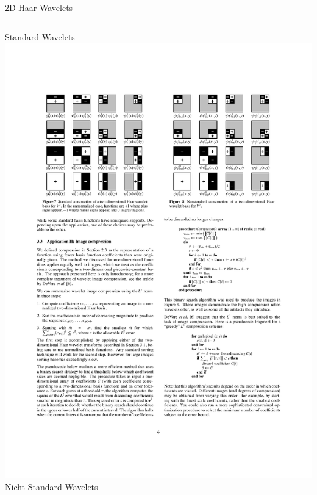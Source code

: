 	{
	\begin{frame}{2D Haar-Wavelets}
		\begin{columns}[T, onlytextwidth]
			\centering
			\alert{Standard-Wavelets}\vspace{4mm}\\
			\includegraphics[trim=79 545 325 100, clip, width=\textwidth]{2d_wavelets.pdf}
			\centering
			\pause
			\alert{Nicht-Standard-Wavelets}\vspace{4mm}\\

\end{columns}
\end{frame}}
